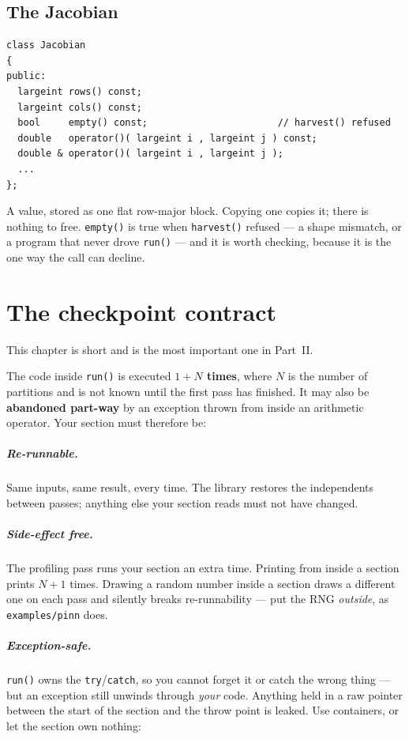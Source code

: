 \documentclass[11pt,a4paper]{report}
\newcommand{\code}[1]{\texttt{#1}}
\begin{document}
\section{The Jacobian}

\begin{lstlisting}
class Jacobian
{
public:
  largeint rows() const;
  largeint cols() const;
  bool     empty() const;                       // harvest() refused
  double   operator()( largeint i , largeint j ) const;
  double & operator()( largeint i , largeint j );
  ...
};
\end{lstlisting}

A value, stored as one flat row-major block. Copying one copies it; there is
nothing to free. \code{empty()} is true when \code{harvest()} refused --- a
shape mismatch, or a program that never drove \code{run()} --- and it is worth
checking, because it is the one way the call can decline.

\chapter{The checkpoint contract}

This chapter is short and is the most important one in Part~II.

\medskip
\noindent
The code inside \code{run()} is executed \textbf{$1+N$ times}, where $N$ is the
number of partitions and is not known until the first pass has finished. It may
also be \textbf{abandoned part-way} by an exception thrown from inside an
arithmetic operator. Your section must therefore be:

\paragraph{Re-runnable.} Same inputs, same result, every time. The library
restores the independents between passes; anything else your section reads must
not have changed.

\paragraph{Side-effect free.} The profiling pass runs your section an extra
time. Printing from inside a section prints $N+1$ times. Drawing a random number
inside a section draws a different one on each pass and silently breaks
re-runnability --- put the RNG \emph{outside}, as \code{examples/pinn} does.

\paragraph{Exception-safe.} \code{run()} owns the \code{try}/\code{catch}, so
you cannot forget it or catch the wrong thing --- but an exception still unwinds
through \emph{your} code. Anything held in a raw pointer between the start of
the section and the throw point is leaked. Use containers, or let the section
own nothing:
\end{document}

